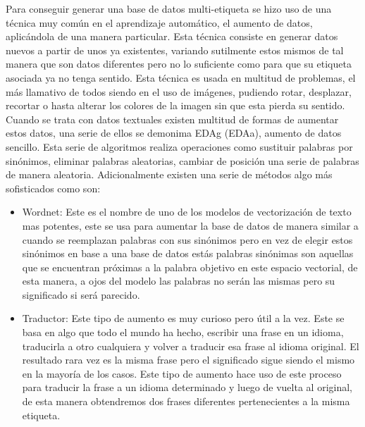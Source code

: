 
Para conseguir  generar una base de datos multi-etiqueta se hizo uso de una
técnica muy común en el aprendizaje automático, el aumento de datos,
aplicándola de una manera particular. Esta técnica consiste en generar datos
nuevos a partir de unos ya existentes, variando sutilmente estos mismos de tal
manera que son datos diferentes pero no lo suficiente como para que su etiqueta
asociada ya no tenga sentido. Esta técnica es usada en multitud de problemas, el
más llamativo de todos siendo en el uso de imágenes, pudiendo rotar, desplazar,
recortar o hasta alterar los colores de la imagen sin que esta pierda su
sentido. Cuando se trata con datos textuales existen multitud de formas de
aumentar estos datos, una serie de ellos se demonima \gls{EDAg} (\gls{EDAa}), aumento de datos sencillo. Esta serie
de algoritmos realiza operaciones como sustituir palabras por sinónimos,
eliminar palabras aleatorias, cambiar de posición una serie de palabras de
manera aleatoria. Adicionalmente existen una serie de métodos algo más
sofisticados como son:

\begin{itemize}
    \item Wordnet: Este es el nombre de uno de los modelos de vectorización de
    texto mas potentes, este se usa para aumentar la base de datos de manera
    similar a cuando se reemplazan palabras con sus sinónimos pero en vez de
    elegir estos sinónimos en base a una base de datos estás palabras sinónimas
    son aquellas que se encuentran próximas a la palabra objetivo en este
    espacio vectorial, de esta manera, a ojos del modelo las palabras no serán
    las mismas pero su significado si será parecido. 
    \item Traductor: Este tipo de aumento es muy curioso pero útil a la vez.
    Este se basa en algo que todo el mundo ha hecho, escribir una frase en un
    idioma, traducirla a otro cualquiera y volver a traducir esa frase al idioma
    original. El resultado rara vez es la misma frase pero el significado sigue siendo el mismo en la mayoría de los casos. Este tipo de aumento
    hace uso de este proceso para traducir la frase a un idioma determinado y
    luego de vuelta al original, de esta manera obtendremos dos frases
    diferentes pertenecientes a la misma etiqueta.
\end{itemize}

